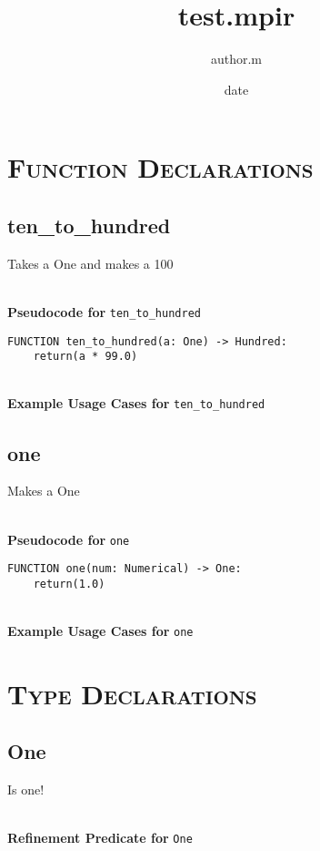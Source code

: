 \documentclass{article}
\title{test.mpir}
\author{author.m}
\date{date}
\begin{document}
\maketitle
\clearpage
\tableofcontents
\clearpage

\section{\textsc{Function Declarations}}

\subsection{ten\_to\_hundred}
Takes a One and makes a 100

\textbf{\\ Pseudocode for } \texttt{ten\_to\_hundred}
\begin{verbatim}
FUNCTION ten_to_hundred(a: One) -> Hundred:
	return(a * 99.0)
\end{verbatim}

\textbf{\\ Example Usage Cases for } \texttt{ten\_to\_hundred}
\clearpage

\subsection{one}
Makes a One

\textbf{\\ Pseudocode for } \texttt{one}
\begin{verbatim}
FUNCTION one(num: Numerical) -> One:
	return(1.0)
\end{verbatim}

\textbf{\\ Example Usage Cases for } \texttt{one}
\clearpage

\section{\textsc{Type Declarations}}

\subsection{One}
Is one!

\textbf{\\ Refinement Predicate for } \texttt{One}
\end{document}
